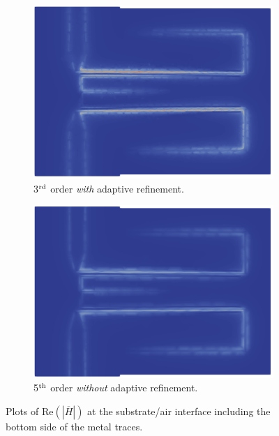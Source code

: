 \documentclass[titlepage]{article}
\renewcommand\_{\textunderscore\linebreak[1]}
\begin{document}
\begin{figure}[H]
  \centering
  \begin{subfigure}{0.45\textwidth}
     \includegraphics[width=\linewidth]{../regression/OpenParEM3D/microstrip/filter_study/screenshots/filter_3rd_order_Hfield}
     \caption{3$^{\textnormal{rd}}$ order \textit{with} adaptive refinement.}
  \end{subfigure}
  \begin{subfigure}{0.45\textwidth}
     \includegraphics[width=\linewidth]{../regression/OpenParEM3D/microstrip/filter_study/screenshots/filter_5th_order_Hfield}
     \caption{5$^{\textnormal{th}}$ order \textit{without} adaptive refinement.}
  \end{subfigure}
  \caption{Plots of Re$(|\overline{H}|)$ at the substrate/air interface including the bottom side of the metal traces.}
  \label{fig:filter_Hfield}
\end{figure}
\end{document}
